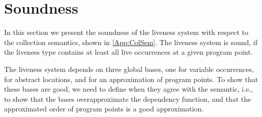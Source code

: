 \documentclass[../../master.tex]{subfiles}
\begin{document}
\iffalse
\begin{itemize}
	\item Introduction (what and how)
	\begin{itemize}
		\item What we will go through
		\item What do we mean with the system being sound
		\item How do we compare the system to the semantic (evaluation)
	\end{itemize}
	\item What should we know to prove the soundness of the liveness system
	\item Agreement of the different basis
	\begin{itemize}
		\item What does it mean to aggree
		\item How does $\Gamma$ and $\Upsilon$ aggree with $w$ and $env$?
		\item How does $\Pi$ aggree with the semantics
		\item How does the live type aggree with the semantics?
	\end{itemize}
	\item Soundness of liveness system (theorem
	\begin{itemize}
		\item What and why
		\item How is it good and what does it say
	\end{itemize}
	\item Rewrite the collection semantics
	\begin{itemize}
		\item The pair $(L,V)$ should contain all live locations and variables
	\end{itemize}
\end{itemize}
\fi

\section{Soundness}
In this section we present the soundness of the liveness system with respect to the collection semantics, shown in \cref{App:ColSem}.
The liveness system is sound, if the liveness type contains at least all live occurrences at a given program point.

The liveness system depends on three global bases, one for variable occurrences, for abstract locations, and for an approximation of program points.
To show that these bases are good, we need to define when they agree with the semantic, i.e., to show that the bases overapproximate the dependency function, and that the approximated order of program points is a good approximation.
\bigskip
\end{document}
